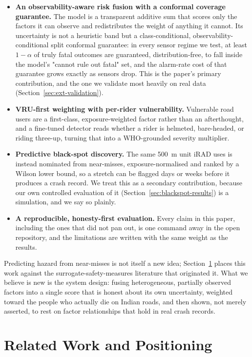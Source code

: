 \documentclass[journal]{IEEEtran}
\begin{document}
\begin{itemize}
\item \textbf{An observability-aware risk fusion with a conformal coverage guarantee.} The model is a transparent additive sum that scores only the factors it can observe and redistributes the weight of anything it cannot. Its uncertainty is not a heuristic band but a class-conditional, observability-conditional split conformal guarantee: in every sensor regime we test, at least $1-\alpha$ of truly fatal outcomes are guaranteed, distribution-free, to fall inside the model's "cannot rule out fatal" set, and the alarm-rate cost of that guarantee grows exactly as sensors drop. This is the paper's primary contribution, and the one we validate most heavily on real data (Section~\ref{sec:ext-validation}).
\item \textbf{VRU-first weighting with per-rider vulnerability.} Vulnerable road users are a first-class, exposure-weighted factor rather than an afterthought, and a fine-tuned detector reads whether a rider is helmeted, bare-headed, or riding three-up, turning that into a WHO-grounded severity multiplier.
\item \textbf{Predictive black-spot discovery.} The same 500~m unit iRAD uses is instead nominated from near-misses, exposure-normalised and ranked by a Wilson lower bound, so a stretch can be flagged days or weeks before it produces a crash record. We treat this as a secondary contribution, because our own controlled evaluation of it (Section~\ref{sec:blackspot-results}) is a simulation, and we say so plainly.
\item \textbf{A reproducible, honesty-first evaluation.} Every claim in this paper, including the ones that did not pan out, is one command away in the open repository, and the limitations are written with the same weight as the results.
\end{itemize}

Predicting hazard from near-misses is not itself a new idea; Section~\ref{sec:related} places this work against the surrogate-safety-measures literature that originated it. What we believe is new is the system design: fusing heterogeneous, partially observed factors into a single score that is honest about its own uncertainty, weighted toward the people who actually die on Indian roads, and then shown, not merely asserted, to rest on factor relationships that hold in real crash records.

\section{Related Work and Positioning}
\label{sec:related}
\end{document}

